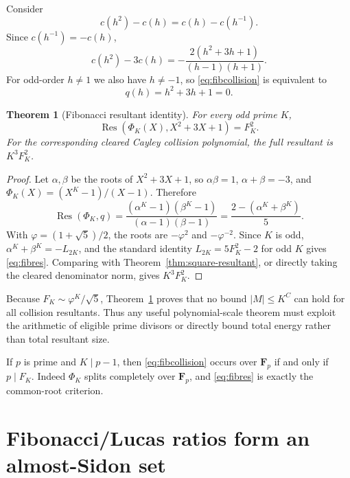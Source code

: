 \documentclass[11pt]{article}
\newtheorem{theorem}{Theorem}[section]
\newcommand{\Fp}{\mathbf F_p}
\newcommand{\Res}{\operatorname{Res}}
\begin{document}
Consider
\begin{equation}\label{eq:fibcollision}
c(h^2)-c(h)=c(h)-c(h^{-1}).
\end{equation}
Since $c(h^{-1})=-c(h)$,
\[
c(h^2)-3c(h)
=-\frac{2(h^2+3h+1)}{(h-1)(h+1)}.
\]
For odd-order $h\ne1$ we also have $h\ne-1$, so
\eqref{eq:fibcollision} is equivalent to
\begin{equation}\label{eq:q}
q(h)=h^2+3h+1=0.
\end{equation}

\begin{theorem}[Fibonacci resultant identity]\label{thm:fibres}
For every odd prime $K$,
\begin{equation}\label{eq:fibres}
\Res(\Phi_K(X),X^2+3X+1)=F_K^2.
\end{equation}
For the corresponding cleared Cayley collision polynomial, the full resultant
is $K^3F_K^2$.
\end{theorem}

\begin{proof}
Let $\alpha,\beta$ be the roots of $X^2+3X+1$, so
$\alpha\beta=1$, $\alpha+\beta=-3$, and
$\Phi_K(X)=(X^K-1)/(X-1)$.  Therefore
\[
\Res(\Phi_K,q)
=\frac{(\alpha^K-1)(\beta^K-1)}{(\alpha-1)(\beta-1)}
=\frac{2-(\alpha^K+\beta^K)}5.
\]
With $\varphi=(1+\sqrt5)/2$, the roots are $-\varphi^2$ and
$-\varphi^{-2}$.  Since $K$ is odd,
$\alpha^K+\beta^K=-L_{2K}$, and the standard identity
$L_{2K}=5F_K^2-2$ for odd $K$ gives \eqref{eq:fibres}.  Comparing with
Theorem~\ref{thm:square-resultant}, or directly taking the cleared denominator
norm, gives $K^3F_K^2$.
\end{proof}

Because $F_K\sim\varphi^K/\sqrt5$, Theorem~\ref{thm:fibres} proves that no
bound $|M|\le K^C$ can hold for all collision resultants.  Thus any useful
polynomial-scale theorem must exploit the arithmetic of eligible prime divisors
or directly bound total energy rather than total resultant size.

If $p$ is prime and $K\mid p-1$, then \eqref{eq:fibcollision} occurs over
$\Fp$ if and only if $p\mid F_K$.  Indeed $\Phi_K$ splits completely over
$\Fp$, and \eqref{eq:fibres} is exactly the common-root criterion.

\section{Fibonacci/Lucas ratios form an almost-Sidon set}
\end{document}
